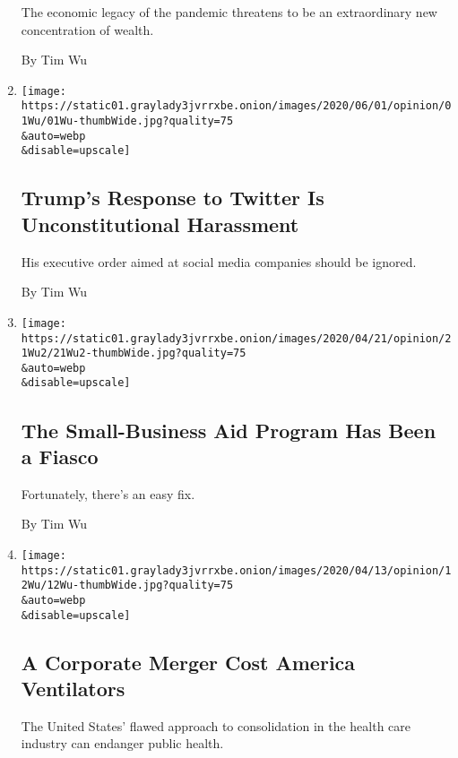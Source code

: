 \begin{enumerate}
  The economic legacy of the pandemic threatens to be an extraordinary
  new concentration of wealth.

  By Tim Wu
\item
  \href{/2020/06/02/opinion/trump-twitter-executive-order.html}{}

  \texttt{[image: https://static01.graylady3jvrrxbe.onion/images/2020/06/01/opinion/01Wu/01Wu-thumbWide.jpg?quality=75\\\&auto=webp\\\&disable=upscale]}

  \hypertarget{trumps-response-to-twitter-is-unconstitutional-harassment}{%
  \subsection{Trump's Response to Twitter Is Unconstitutional
  Harassment}\label{trumps-response-to-twitter-is-unconstitutional-harassment}}

  His executive order aimed at social media companies should be ignored.

  By Tim Wu
\item
  \href{/2020/04/21/opinion/paycheck-protection-program.html}{}

  \texttt{[image: https://static01.graylady3jvrrxbe.onion/images/2020/04/21/opinion/21Wu2/21Wu2-thumbWide.jpg?quality=75\\\&auto=webp\\\&disable=upscale]}

  \hypertarget{the-small-business-aid-program-has-been-a-fiasco}{%
  \subsection{The Small-Business Aid Program Has Been a
  Fiasco}\label{the-small-business-aid-program-has-been-a-fiasco}}

  Fortunately, there's an easy fix.

  By Tim Wu
\item
  \href{/2020/04/12/opinion/ventilators-coronavirus.html}{}

  \texttt{[image: https://static01.graylady3jvrrxbe.onion/images/2020/04/13/opinion/12Wu/12Wu-thumbWide.jpg?quality=75\\\&auto=webp\\\&disable=upscale]}

  \hypertarget{a-corporate-merger-cost-america-ventilators}{%
  \subsection{A Corporate Merger Cost America
  Ventilators}\label{a-corporate-merger-cost-america-ventilators}}

  The United States' flawed approach to consolidation in the health care
  industry can endanger public health.


\end{enumerate}
